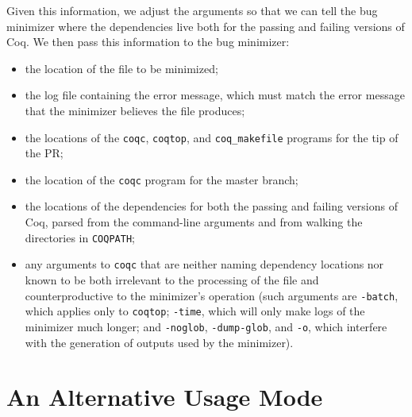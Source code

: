 \documentclass[a4paper,USenglish,cleveref,autoref,thm-restate]{lipics-v2021}
\makeatletter
\newcommand{\todo}[1]{%
\@latex@warning{TODO: \detokenize{#1} on page \thepage}%
\textcolor{red}{[\textbf{TODO:} #1]}}%
\makeatother
\begin{document}
Given this information, we adjust the arguments so that we can tell the bug minimizer where the dependencies live both for the passing and failing versions of Coq.
We then pass this information to the bug minimizer:
\begin{itemize}
\item the location of the file to be minimized;
\item the log file containing the error message, which must match the error message that the minimizer believes the file produces;
\item the locations of the \verb|coqc|, \verb|coqtop|, and \verb|coq_makefile| programs for the tip of the PR;
\item the location of the \verb|coqc| program for the master branch;
\item the locations of the dependencies for both the passing and failing versions of Coq, parsed from the command-line arguments and from walking the directories in \texttt{COQPATH};
\item any arguments to \verb|coqc| that are neither naming dependency locations nor known to be both irrelevant to the processing of the file and counterproductive to the minimizer's operation (such arguments are \verb|-batch|, which applies only to \verb|coqtop|; \verb|-time|, which will only make logs of the minimizer much longer; and \verb|-noglob|, \verb|-dump-glob|, and \verb|-o|, which interfere with the generation of outputs used by the minimizer).
\end{itemize}






\section{An Alternative Usage Mode}
\end{document}
